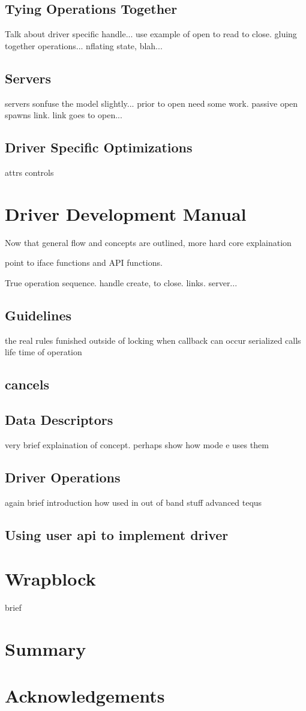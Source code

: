 \documentclass[11pt]{article}
\begin{document}
\subsection{Tying Operations Together}
Talk about driver specific handle...  use example of open to 
read to close.
gluing together operations... nflating state, blah...

\subsection{Servers}
servers sonfuse the model slightly... prior to open need some work.  passive
open spawns link.  link goes to open...

\subsection{Driver Specific Optimizations}
attrs
controls

\section{Driver Development Manual}
Now that general flow and concepts are outlined, more hard core explaination

point to iface functions and API functions.

True operation sequence.  handle create, to close.  links.  server...

\subsection{Guidelines}
the real rules
funished outside of locking
when callback can occur
serialized calls
life time of operation

\subsection{cancels}

\subsection{Data Descriptors}
very brief explaination of concept.  perhaps show how mode e uses them

\subsection{Driver Operations}
again brief introduction
how used in out of band stuff
advanced tequs

\subsection{Using user api to implement driver}

\section{Wrapblock}
brief

\section{Summary}

\section*{Acknowledgements}
\end{document}
